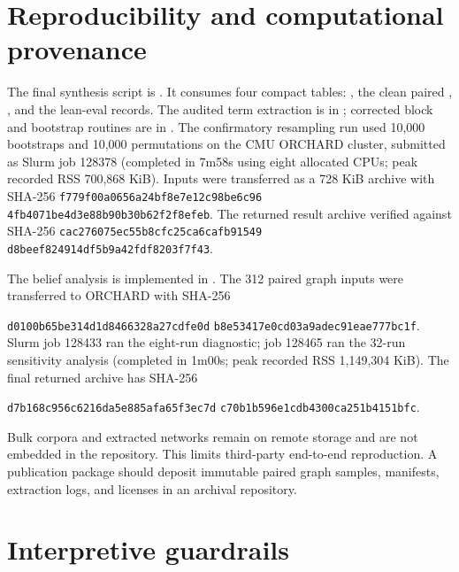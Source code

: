 \documentclass[11pt]{article}
\begin{document}
\appendix
\section{Reproducibility and computational provenance}

The final synthesis script is .  It consumes four compact tables:
, the clean paired ,
, and the lean-eval records.  The audited term extraction is in
; corrected block and bootstrap routines are in
.  The confirmatory resampling run used 10,000 bootstraps and 10,000
permutations on the CMU ORCHARD cluster, submitted as Slurm job 128378 (completed in 7m58s using
eight allocated CPUs; peak recorded RSS 700,868 KiB).  Inputs were transferred as a
728 KiB archive with SHA-256
\texttt{f779f00a0656a24bf8e7e12c98be6c96}\allowbreak
\texttt{4fb4071be4d3e88b90b30b62f2f8efeb}.  The returned result
archive verified against SHA-256
\texttt{cac276075ec55b8cfc25ca6cafb91549}\allowbreak
\texttt{d8beef824914df5b9a42fdf8203f7f43}.

The belief analysis is implemented in .  The 312 paired graph
inputs were transferred to ORCHARD with SHA-256
\par\noindent
\texttt{d0100b65be314d1d8466328a27cdfe0d}\allowbreak
\texttt{b8e53417e0cd03a9adec91eae777bc1f}.  Slurm job 128433 ran the eight-run diagnostic; job
128465 ran the 32-run sensitivity analysis (completed in 1m00s; peak recorded RSS 1,149,304 KiB).
The final returned archive has SHA-256
\par\noindent
\texttt{d7b168c956c6216da5e885afa65f3ec7d}\allowbreak
\texttt{c70b1b596e1cdb4300ca251b4151bfc}.

Bulk corpora and extracted networks remain on remote storage and are not embedded in the repository.
This limits third-party end-to-end reproduction.  A publication package should deposit immutable
paired graph samples, manifests, extraction logs, and licenses in an archival repository.

\section{Interpretive guardrails}
\end{document}

